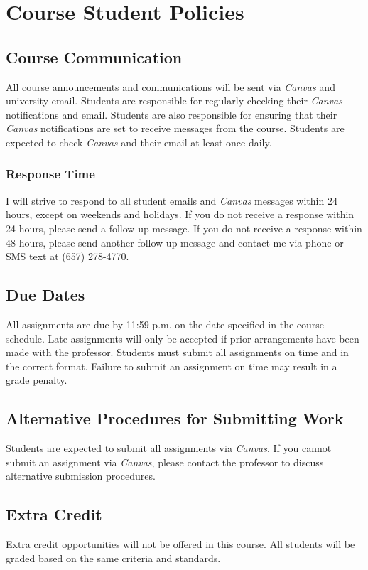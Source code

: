 \documentclass[12pt, letterpaper]{article}
\begin{document}
\section{Course Student Policies}

\subsection*{Course Communication}
All course announcements and communications will be sent via \emph{Canvas} and university email. Students are responsible for regularly checking their \emph{Canvas} notifications and email. Students are also responsible for ensuring that their \emph{Canvas} notifications are set to receive messages from the course. Students are expected to check \emph{Canvas} and their email at least once daily.

\subsubsection*{Response Time}I will strive to respond to all student emails and \emph{Canvas} messages within 24 hours, except on weekends and holidays. If you do not receive a response within 24 hours, please send a follow-up message. If you do not receive a response within 48 hours, please send another follow-up message and contact me via phone or SMS text at (657) 278-4770.

\subsection*{Due Dates}
All assignments are due by 11:59 p.m. on the date specified in the course schedule. Late assignments will only be accepted if prior arrangements have been made with the professor. Students must submit all assignments on time and in the correct format. Failure to submit an assignment on time may result in a grade penalty.

\subsection*{Alternative Procedures for Submitting Work}
Students are expected to submit all assignments via \emph{Canvas}. If you cannot submit an assignment via \emph{Canvas}, please contact the professor to discuss alternative submission procedures.

\subsection*{Extra Credit}
Extra credit opportunities will not be offered in this course. All students will be graded based on the same criteria and standards.
\end{document}

